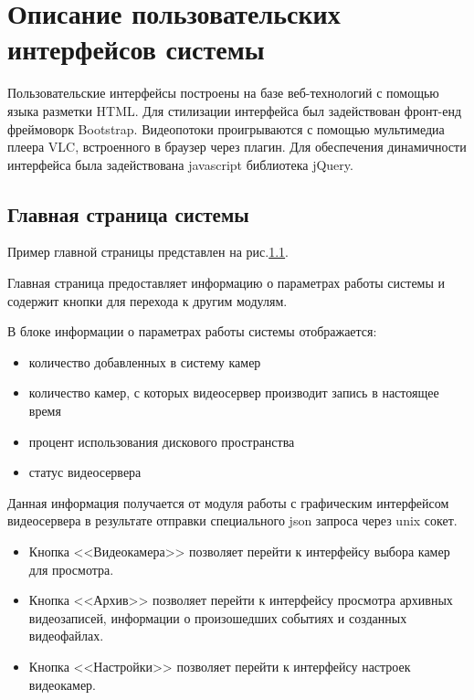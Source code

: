 \chapter{Описание пользовательских интерфейсов системы}
Пользовательские интерфейсы построены на базе веб-технологий с помощью языка разметки HTML.
Для стилизации интерфейса был задействован фронт-енд фреймоворк Bootstrap.
Видеопотоки проигрываются с помощью мультимедиа плеера VLC, встроенного в браузер через плагин.
Для обеспечения динамичности интерфейса была задействована javascript библиотека jQuery.

\begin{figure}[!htb]
\def\svgwidth{\columnwidth}
\caption{}
\label{ui_1}
\end{figure}

\section{Главная страница системы}
Пример главной страницы представлен на рис.\ref{ui_1}.

Главная страница предоставляет информацию о параметрах работы системы и содержит
кнопки для перехода к другим модулям.

В блоке информации о параметрах работы системы отображается:
\smallskip
\begin{itemize}
\item количество добавленных в систему камер
\item количество камер, с которых видеосервер производит запись в настоящее время
\item процент использования дискового пространства
\item статус видеосервера
\end{itemize}

Данная информация получается от модуля работы с графическим интерфейсом видеосервера
в результате отправки специального json запроса через unix сокет.

\begin{itemize}
\item Кнопка <<Видеокамера>> позволяет перейти к интерфейсу выбора камер для просмотра.
\item Кнопка <<Архив>> позволяет перейти к интерфейсу просмотра архивных видеозаписей, информации
о произошедших событиях и созданных видеофайлах.
\item Кнопка <<Настройки>> позволяет перейти к интерфейсу настроек видеокамер.
\end{itemize}

